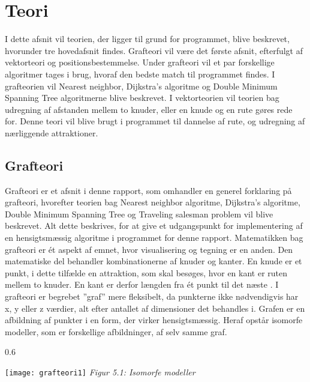 \chapter{Teori}
I dette afsnit vil teorien, der ligger til grund for programmet, blive beskrevet, hvorunder tre hovedafsnit findes. Grafteori vil være det første afsnit, efterfulgt af vektorteori og  positionsbestemmelse. Under grafteori vil et par forskellige algoritmer tages i brug, hvoraf den bedste match til programmet findes. I grafteorien vil Nearest neighbor, Dijkstra’s algoritme og Double Minimum Spanning Tree algoritmerne blive beskrevet. I vektorteorien vil teorien bag udregning af afstanden mellem to knuder, eller en knude og en rute gøres rede for. Denne teori vil blive brugt i programmet til dannelse af rute, og udregning af nærliggende attraktioner.

\section{Grafteori}
Grafteori er et afsnit i denne rapport, som omhandler en generel forklaring på grafteori, hvorefter teorien bag Nearest neighbor algoritme, Dijkstra’s algoritme, Double Minimum Spanning Tree og Traveling salesman problem vil blive beskrevet. Alt dette beskrives, for at give et udgangspunkt for implementering af en hensigtsmæssig algoritme i programmet for denne rapport.\newline
Matematikken bag grafteori er ét aspekt af emnet, hvor visualisering og tegning er en anden. Den matematiske del behandler kombinationerne af knuder og kanter. En knude er et punkt, i dette tilfælde en attraktion, som skal besøges, hvor en kant er ruten mellem to knuder. En kant er derfor længden fra ét punkt til det næste \citep{GraphTheory}.
I grafteori er begrebet ”graf” mere fleksibelt, da punkterne ikke nødvendigvis har x, y eller z værdier, alt efter antallet af dimensioner det behandles i. Grafen er en afbildning af punkter i en form, der virker hensigtsmæssig. Heraf opstår isomorfe modeller, som er forskellige afbildninger, af selv samme graf. 

\begin{wrapfigure}{}{0.6\textwidth}
	\vspace{-20pt}
	\begin{center}
		\texttt{[image: grafteori1]} \newline
		\textit{Figur 5.1: Isomorfe modeller}\newline
	\end{center}
	\vspace{-20pt}
	\vspace{-20pt}
\end{wrapfigure}

